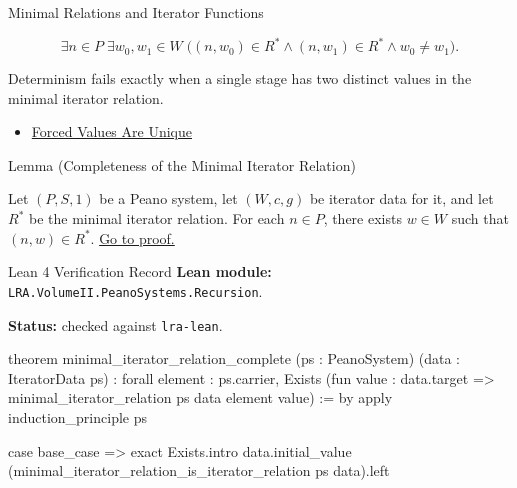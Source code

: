 \begin{topicbox}{Minimal Relations and Iterator Functions}
\begin{remark*}
\[
\exists n\in P\;\exists w_0,w_1\in W\;
\bigl((n,w_0)\in R^*\land (n,w_1)\in R^*\land w_0\neq w_1\bigr).
\]
\end{remark*}

\begin{remark*}
Determinism fails exactly when a single stage has two distinct values in the
minimal iterator relation.
\end{remark*}

\begin{dependencies}
\begin{itemize}
  \item \hyperref[lem:forced-values-are-unique]{Forced Values Are Unique}
\end{itemize}
\end{dependencies}

\begin{lemmabox}{Lemma (Completeness of the Minimal Iterator Relation)}
\begin{lemma}
\label{lem:minimal-iterator-relation-complete}
Let $(P,S,1)$ be a Peano system, let $(W,c,g)$ be iterator data for it, and let
$R^*$ be the minimal iterator relation. For each $n\in P$, there exists
$w\in W$ such that $(n,w)\in R^*$.
\hyperref[prf:minimal-iterator-relation-complete]{Go to proof.}
\end{lemma}
\end{lemmabox}

\begin{formalizationrecord}{Lean 4 Verification Record}
\textbf{Lean module:} \texttt{LRA.VolumeII.PeanoSystems.Recursion}.\par
{}
\textbf{Status:} checked against \texttt{lra-lean}.\par

\begin{leancode}
theorem minimal_iterator_relation_complete
    (ps : PeanoSystem)
    (data : IteratorData ps) :
    forall element : ps.carrier,
      Exists (fun value : data.target =>
        minimal_iterator_relation ps data element value) := by
  apply induction_principle ps

  case base_case =>
    exact
      Exists.intro
        data.initial_value
        (minimal_iterator_relation_is_iterator_relation ps data).left


\end{leancode}
\end{formalizationrecord}
\end{topicbox}
